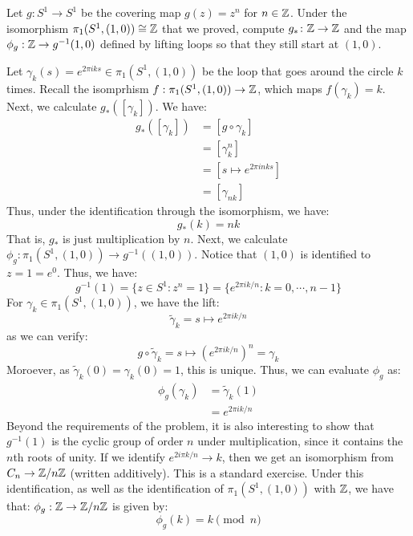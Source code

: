 \documentclass[12pt]{article}
\begin{document}
\begin{problab}{2}
    Let $g\colon S^1 \to S^1$ be the covering map $g(z) = z^n$ for $n \in \mathbb{Z}$. Under the isomorphism $\pi_1(S^1, (1,0)) \cong \mathbb{Z}$ that we proved, compute $g_* \colon \mathbb{Z} \to \mathbb{Z}$ and the map $\phi_g: \mathbb{Z} \to g^{-1}(1,0)$ defined by lifting loops so that they still start at $(1,0)$.
\end{problab}
\begin{solu}
    Let $\gamma_k(s) = e^{2\pi i ks} \in \pi_1(S^1, (1, 0))$ be the loop that goes around the circle $k$ times. Recall the isomprhism $f: \pi_1(S^1, (1,0)) \to \mathbb{Z}$, which maps $f(\gamma_k) = k$. \bbni
    Next, we calculate $g_*([\gamma_k])$. We have:
    \begin{align*}
        g_*([\gamma_k]) &= [g \circ \gamma_k] \\
        &= [\gamma_k^n] \\
        &= [s \mapsto e^{2\pi i nk s}] \\
        &= [\gamma_{nk}]
    \end{align*}
    Thus, under the identification through the isomorphism, we have:
    \[g_*(k) = nk\]
    That is, $g_*$ is just multiplication by $n$.\bbni
    Next, we calculate $\phi_g: \pi_1(S^1, (1, 0)) \to g^{-1}((1,0))$. Notice that $(1,0)$ is identified to $z = 1 = e^0$. Thus, we have: 
    \[ g^{-1}(1) = \{z \in S^1: z^n = 1\} = \{e^{2\pi i k/n}: k = 0, \cdots, n-1\}\]
    For $\gamma_k \in \pi_1(S^1, (1,0))$, we have the lift: 
    \[\tilde{\gamma}_k = s \mapsto e^{2\pi i k/n}\]
    as we can verify: 
    \[ g \circ \tilde{\gamma}_k = s \mapsto (e^{2\pi i k/n})^n = \gamma_k\]
    Moroever, as $\tilde{\gamma}_k(0) = \gamma_k(0) = 1$, this is unique. Thus, we can evaluate $\phi_g$ as:
    \begin{align*}
        \phi_g(\gamma_k) &= \tilde{\gamma}_k(1) \\
        &= e^{2\pi i k/n}
    \end{align*}
    Beyond the requirements of the problem, it is also interesting to show that $g^{-1}(1)$ is the cyclic group of order $n$ under multiplication, since it contains the $n$th roots of unity. If we identify $e^{2i\pi k/n} \to k$, then we get an isomorphism from $C_n \to \mathbb Z/n\mathbb Z$ (written additively). This is a standard exercise. Under this identification, as well as the identification of $\pi_1(S^1, (1,0))$ with $\mathbb Z$, we have that: $\phi_g: \mathbb Z \to \mathbb Z/n\mathbb Z$ is given by:
    \[ \phi_g(k) = k\pmod n\]
\end{solu}
\newpage
\end{document}
